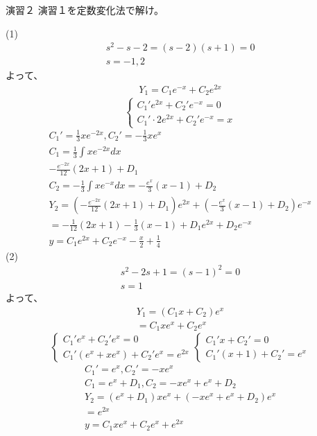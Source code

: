 \documentclass{jsarticle}
\begin{document}
\begin{itembox}[l]{演習２}
演習１を定数変化法で解け。
\end{itembox}
(1)
\begin{eqnarray}
s^2-s-2=(s-2)(s+1)=0\\
s=-1,2
\end{eqnarray}
よって、
\begin{eqnarray}
Y_1=C_1e^{-x}+C_2e^{2x}
\end{eqnarray}
\begin{displaymath}
\left\{
\begin{array}{l}
C_1'e^{2x}+C_2'e^{-x}=0  \\
C_1'\cdot 2e^{2x}+C_2'e^{-x}=x
\end{array}
\right.
\end{displaymath}
\begin{eqnarray}
C_1'=\frac{1}{3}xe^{-2x},C_2'=-\frac{1}{3}xe^x\\
C_1=\frac{1}{3}\int xe^{-2x}dx\\
-\frac{e^{-2x}}{12}(2x+1)+D_1\\
C_2=-\frac{1}{3}\int xe^{-x}dx =-\frac{e^x}{3}(x-1)+D_2\\
Y_2=\left(-\frac{e^{-2x}}{12}(2x+1)+D_1\right)e^{2x}+\left(-\frac{e^x}{3}(x-1)+D_2\right)e^{-x}\\
=-\frac{1}{12}(2x+1)-\frac{1}{3}(x-1)+D_1e^{2x}+D_2e^{-x}\\
y=C_1e^{2x}+C_2e^{-x}-\frac{x}{2}+\frac{1}{4}
\end{eqnarray}
(2)
\begin{eqnarray}
s^2-2s+1=(s-1)^2=0\\
s=1
\end{eqnarray}
よって、
\begin{eqnarray}
Y_1=(C_1x+C_2)e^x\\
=C_1xe^x+C_2e^x
\end{eqnarray}
\begin{displaymath}
\left\{
\begin{array}{l}
C_1'e^x+C_2'e^x=0  \\
C_1'(e^x+xe^x)+C_2'e^x=e^{2x}
\end{array}
\right.
\left\{
\begin{array}{l}
C_1'x+C_2'=0  \\
C_1'(x+1)+C_2'=e^x
\end{array}
\right.
\end{displaymath}
\begin{eqnarray}
C_1'=e^x,C_2'=-xe^x\\
C_1=e^x+D_1,C_2=-xe^x+e^x+D_2\\
Y_2=(e^x+D_1)xe^x+(-xe^x+e^x+D_2)e^x\\
=e^{2x}\\
y=C_1xe^x+C_2e^x+e^{2x}
\end{eqnarray}
\end{document}
